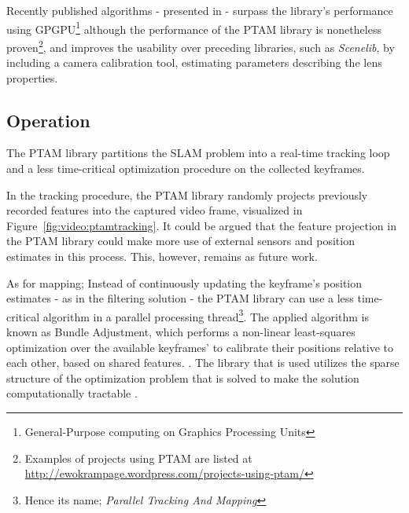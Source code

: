         Recently published algorithms - presented in \citep{Newcombe2011} - surpass
        the library's performance using GPGPU\footnote{General-Purpose computing on Graphics Processing Units}
        although the performance of the PTAM library is nonetheless proven\footnote{Examples of projects using PTAM are listed at \url{http://ewokrampage.wordpress.com/projects-using-ptam/}},
        and improves the usability over preceding libraries, such as \textit{Scenelib}, by including
        a camera calibration tool, estimating parameters describing the lens properties.

        \subsection{Operation}
            The PTAM library partitions the SLAM problem into a real-time tracking
            loop and a less time-critical optimization procedure on the collected keyframes.

            In the tracking procedure, the PTAM library randomly projects previously recorded features into the
            captured video frame, visualized in Figure~\ref{fig:video:ptamtracking}. It could be argued that the feature projection in the PTAM library
            could make more use of external sensors and position estimates in this process.
            This, however, remains as future work.

            As for mapping; Instead of continuously updating the keyframe's position estimates - as in the filtering solution -
            the PTAM library can use a less time-critical algorithm in a parallel processing thread\footnote{Hence its name; \textit{Parallel Tracking And Mapping}}.
            The applied algorithm is known as Bundle Adjustment, which
            performs a non-linear least-squares optimization over the available keyframes'
            to calibrate their positions relative to each other, based on shared features. \citep{lour09}.
            The library that is used utilizes the sparse structure of the optimization problem that
            is solved to make the solution computationally tractable \citep{Lourakis11bundle}.

